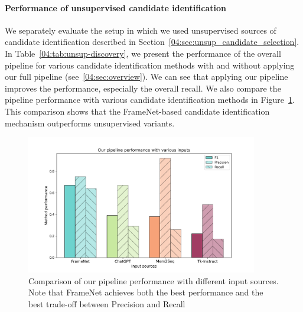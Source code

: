 \paragraph{Performance of unsupervised candidate identification}
We separately evaluate the setup in which we used unsupervised sources of candidate identification described in Section~\ref{04:sec:unsup_candidate_selection}.
In Table~\ref{04:tab:unsup-discovery}, we present the performance of the overall pipeline for various candidate identification methods with and without applying our full pipeline (see~\ref{04:sec:overview}).
We can see that applying our pipeline improves the performance, especially the overall recall.
We also compare the pipeline performance with various candidate identification methods in Figure~\ref{04:fig:compare_sources}.
This comparison shows that the FrameNet-based candidate identification mechanism outperforms unsupervised variants.
\begin{figure}[h]
    \centering
    \includegraphics[width=0.9\textwidth]{images/slot-discovery.png}
    \caption{Comparison of our pipeline performance with different input sources. Note that FrameNet achieves both the best performance and the best trade-off between Precision and Recall}
    \label{04:fig:compare_sources}
\end{figure}

